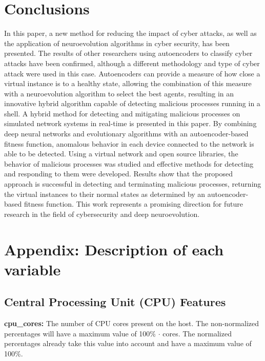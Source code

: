 \documentclass{iosart2c}
\begin{document}
\section{Conclusions}

In this paper, a new method for reducing the impact of cyber attacks, as well as the application of neuroevolution algorithms in cyber security, has been presented. The results of other researchers \cite{autoencoderdos, autoencoder1, autoencoder3} using autoencoders to classify cyber attacks have been confirmed, although a different methodology and type of cyber attack were used in this case. Autoencoders can provide a measure of how close a virtual instance is to a healthy state, allowing the combination of this measure with a neuroevolution algorithm to select the best agents, resulting in an innovative hybrid algorithm capable of detecting malicious processes running in a shell.
A hybrid method for detecting and mitigating malicious processes on simulated network systems in real-time is presented in this paper. By combining deep neural networks and evolutionary algorithms with an autoencoder-based fitness function, anomalous behavior in each device connected to the network is able to be detected. Using a virtual network and open source libraries, the behavior of malicious processes was studied and effective methods for detecting and responding to them were developed. Results show that the proposed approach is successful in detecting and terminating malicious processes, returning the virtual instances to their normal states as determined by an autoencoder-based fitness function. This work represents a promising direction for future research in the field of cybersecurity and deep neuroevolution.

\appendix
\section{Appendix: Description of each variable}\label{appx_variables}

\subsection{Central Processing Unit (CPU) Features}

\textbf{cpu\_cores:} The number of CPU cores present on the host. The non-normalized percentages will have a maximum value of 100\% $\cdot$ cores. The normalized percentages already take this value into account and have a maximum value of 100\%.\\
\end{document}
